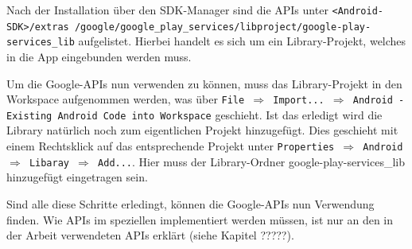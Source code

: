 Nach der Installation \"uber den \ac{SDK}-Manager sind die APIs unter \texttt{<Android-SDK>/extras /google/google\_play\_services/libproject/google-play-services\_lib} aufgelistet. Hierbei handelt es sich um ein Library-Projekt, welches in die App eingebunden werden muss.

Um die Google-APIs nun verwenden zu k\"onnen, muss das Library-Projekt in den Workspace aufgenommen werden, was \"uber \texttt{File $\Rightarrow$ Import... $\Rightarrow$ Android - Existing Android Code into Workspace} geschieht. Ist das erledigt wird die Library nat\"urlich noch zum eigentlichen Projekt hinzugef\"ugt. Dies geschieht mit einem Rechtsklick auf das entsprechende Projekt unter \texttt{Properties $\Rightarrow$ Android $\Rightarrow$ Libaray $\Rightarrow$ Add...}. Hier muss der Library-Ordner google-play-services\_lib hinzugef\"ugt eingetragen sein.

Sind alle diese Schritte erledingt, k\"onnen die Google-APIs nun Verwendung finden. Wie APIs im speziellen implementiert werden m\"ussen, ist nur an den in der Arbeit verwendeten APIs erkl\"art (siehe Kapitel ?????). \cite{ApiAccess} \cite{GolemHBGoogleServices}